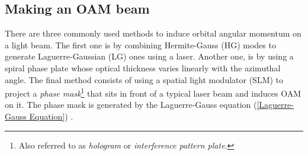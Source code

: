\subsection{Making an OAM beam}
\label{c2:Making an OAM beam}

There are three commonly used methods to induce orbital angular momentum on a light beam. The first one is by combining Hermite-Gauss (HG) modes to generate Laguerre-Gaussian (LG) ones using a laser. Another one, is by using a spiral phase plate whose optical thickness varies linearly with the azimuthal angle. The final method consists of using a spatial light modulator (SLM) to project a \textit{phase mask}\footnote{Also referred to as \textit{hologram} or \textit{interference pattern plate}.} that sits in front of a typical laser beam and induces OAM on it. The phase mask is generated by the Laguerre-Gauss equation (\ref{Laguerre-Gauss Equation}) \cite{Anguita:08}.


